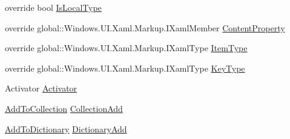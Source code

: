 \begin{DoxyCompactItemize}
override bool \hyperlink{class_e_l_i_client_1_1_e_l_i_client___xaml_type_info_1_1_xaml_user_type_a9f0bbddaa97537b91cf6489e9da3fe57}{Is\+Local\+Type}
\item 
override global\+::\+Windows.\+U\+I.\+Xaml.\+Markup.\+I\+Xaml\+Member \hyperlink{class_e_l_i_client_1_1_e_l_i_client___xaml_type_info_1_1_xaml_user_type_a01fedcf46f02672e815c50d989a48a27}{Content\+Property}
\item 
override global\+::\+Windows.\+U\+I.\+Xaml.\+Markup.\+I\+Xaml\+Type \hyperlink{class_e_l_i_client_1_1_e_l_i_client___xaml_type_info_1_1_xaml_user_type_a1a60f3c88608c52e092a13fd760b4e51}{Item\+Type}
\item 
override global\+::\+Windows.\+U\+I.\+Xaml.\+Markup.\+I\+Xaml\+Type \hyperlink{class_e_l_i_client_1_1_e_l_i_client___xaml_type_info_1_1_xaml_user_type_adcf822ebead7a7fe604519de4399b6ef}{Key\+Type}
\item 
Activator \hyperlink{class_e_l_i_client_1_1_e_l_i_client___xaml_type_info_1_1_xaml_user_type_a05af06c018d8a950f14811d0ee39e1b7}{Activator}
\item 
\hyperlink{namespace_e_l_i_client_1_1_e_l_i_client___xaml_type_info_a911f5e2273e056b5e19fb485d0738439}{Add\+To\+Collection} \hyperlink{class_e_l_i_client_1_1_e_l_i_client___xaml_type_info_1_1_xaml_user_type_ad253135c8c912219b6133b2c18e5f288}{Collection\+Add}
\item 
\hyperlink{namespace_e_l_i_client_1_1_e_l_i_client___xaml_type_info_aeed6ff3f2a0b46176be771c9b3f4fd4c}{Add\+To\+Dictionary} \hyperlink{class_e_l_i_client_1_1_e_l_i_client___xaml_type_info_1_1_xaml_user_type_a5ecb07bfa683df850be90cabc7f7bf71}{Dictionary\+Add}
\end{DoxyCompactItemize}
